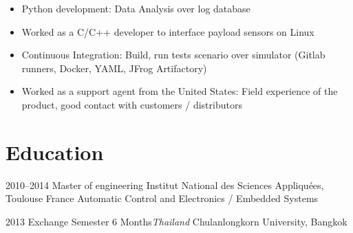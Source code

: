\documentclass[a4paper]{friggeri-cv} %
\begin{document}
\begin{entrylist}
{\begin{itemize}
\item Python development: Data Analysis over log database %
\item Worked as a C/C++ developer to interface payload sensors on Linux%
\item Continuous Integration: Build, run tests scenario over simulator (Gitlab runners, Docker, YAML, JFrog Artifactory) 
\item Worked as a support agent from the United States: Field experience of the
	product, good contact with customers / distributors
\end{itemize}
%
}
%


\end{entrylist}


\section{Education}
\begin{entrylist}

 \entry
{2010--2014}
{Master of engineering}
{Institut National des Sciences Appliquées, Toulouse France}
{Automatic Control and Electronics / Embedded Systems}


\entry
{2013}
{Exchange Semester 6 Months\textit{Thailand}}
{Chulanlongkorn University, Bangkok}
{}



\end{entrylist}
\end{document}
